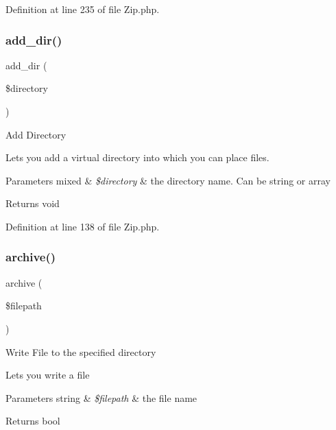 Definition at line 235 of file Zip.\+php.

\mbox{\label{class_c_i___zip_a86b6a309dad105e43b446dc9f8820703}} 
\subsubsection{\texorpdfstring{add\_dir()}{add\_dir()}}
{\footnotesize\ttfamily add\+\_\+dir (\begin{DoxyParamCaption}\item[{}]{\$directory }\end{DoxyParamCaption})}

Add Directory

Lets you add a virtual directory into which you can place files.


\begin{DoxyParams}[1]{Parameters}
mixed & {\em \$directory} & the directory name. Can be string or array \\
\hline
\end{DoxyParams}
\begin{DoxyReturn}{Returns}
void 
\end{DoxyReturn}


Definition at line 138 of file Zip.\+php.

\mbox{\label{class_c_i___zip_a935879d7074c751a4ac886aebd66cbd4}} 
\subsubsection{\texorpdfstring{archive()}{archive()}}
{\footnotesize\ttfamily archive (\begin{DoxyParamCaption}\item[{}]{\$filepath }\end{DoxyParamCaption})}

Write File to the specified directory

Lets you write a file


\begin{DoxyParams}[1]{Parameters}
string & {\em \$filepath} & the file name \\
\hline
\end{DoxyParams}
\begin{DoxyReturn}{Returns}
bool 
\end{DoxyReturn}


